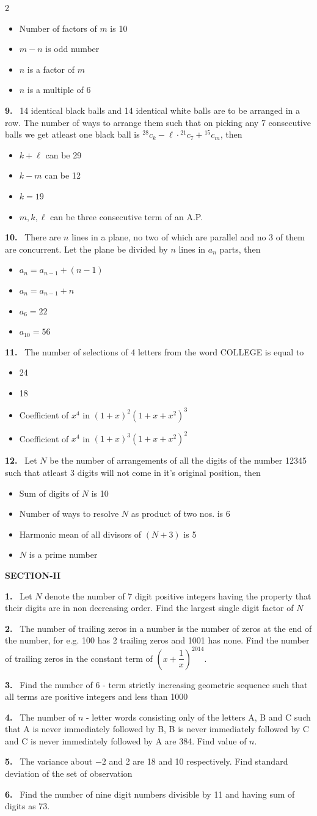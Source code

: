 \documentclass[10pt]{extarticle}
\newcommand{\sect}[1]{\par\smallskip\noindent\textbf{#1}\par}
\newcommand{\qn}[1]{\par\smallskip\noindent\textbf{#1.}~}
\newenvironment{qoptions}{\begin{itemize}[leftmargin=1.8em,itemsep=1pt,topsep=2pt,label={}]}{\end{itemize}}
\newcommand{\opt}[2]{\item[(#1)] #2}
\begin{document}
\begin{multicols}{2}
\begin{qoptions}
\opt{A}{Number of factors of $m$ is 10}
\opt{B}{$m-n$ is odd number}
\opt{C}{$n$ is a factor of $m$}
\opt{D}{$n$ is a multiple of 6}
\end{qoptions}
\qn{9} 14 identical black balls and 14 identical white balls are to be arranged in a row. The number of ways to arrange them such that on picking any 7 consecutive balls we get atleast one black ball is ${}^{28}c_k-\ell\cdot{}^{21}c_7+{}^{15}c_m$, then
\begin{qoptions}
\opt{A}{$k+\ell$ can be 29}
\opt{B}{$k-m$ can be 12}
\opt{C}{$k=19$}
\opt{D}{$m,k,\ell$ can be three consecutive term of an A.P.}
\end{qoptions}
\qn{10} There are $n$ lines in a plane, no two of which are parallel and no 3 of them are concurrent. Let the plane be divided by $n$ lines in $a_n$ parts, then
\begin{qoptions}
\opt{A}{$a_n=a_{n-1}+(n-1)$}
\opt{B}{$a_n=a_{n-1}+n$}
\opt{C}{$a_6=22$}
\opt{D}{$a_{10}=56$}
\end{qoptions}
\qn{11} The number of selections of 4 letters from the word COLLEGE is equal to
\begin{qoptions}
\opt{A}{24}
\opt{B}{18}
\opt{C}{Coefficient of $x^4$ in $(1+x)^2\left(1+x+x^2\right)^3$}
\opt{D}{Coefficient of $x^4$ in $(1+x)^3\left(1+x+x^2\right)^2$}
\end{qoptions}
\qn{12} Let $N$ be the number of arrangements of all the digits of the number 12345 such that atleast 3 digits will not come in it's original position, then
\begin{qoptions}
\opt{A}{Sum of digits of $N$ is 10}
\opt{B}{Number of ways to resolve $N$ as product of two nos. is 6}
\opt{C}{Harmonic mean of all divisors of $(N+3)$ is 5}
\opt{D}{$N$ is a prime number}
\end{qoptions}
\sect{SECTION-II}
\qn{1} Let $N$ denote the number of 7 digit positive integers having the property that their digits are in non decreasing order. Find the largest single digit factor of $N$
\qn{2} The number of trailing zeros in a number is the number of zeros at the end of the number, for e.g. 100 has 2 trailing zeros and 1001 has none. Find the number of trailing zeros in the constant term of $\left(x+\dfrac1x\right)^{2014}$.
\qn{3} Find the number of 6 - term strictly increasing geometric sequence such that all terms are positive integers and less than 1000
\qn{4} The number of $n$ - letter words consisting only of the letters A, B and C such that A is never immediately followed by B, B is never immediately followed by C and C is never immediately followed by A are 384. Find value of $n$.
\qn{5} The variance about $-2$ and 2 are 18 and 10 respectively. Find standard deviation of the set of observation
\qn{6} Find the number of nine digit numbers divisible by 11 and having sum of digits as 73.
\end{multicols}
\end{document}
